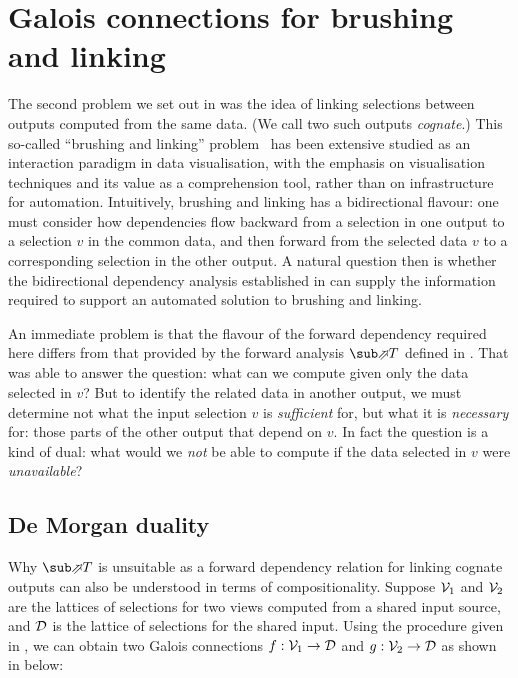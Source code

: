 \section{Galois connections for brushing and linking}
\label{sec:de-morgan}

The second problem we set out in  was the idea of linking selections between outputs computed from the same data. (We call two such outputs \emph{cognate}.) This so-called ``brushing and linking'' problem~\cite{becker87} has been extensive studied as an interaction paradigm in data visualisation, with the emphasis on visualisation techniques and its value as a comprehension tool, rather than on infrastructure for automation. Intuitively, brushing and linking has a bidirectional flavour: one must consider how dependencies flow backward from a selection in one output to a selection $v$ in the common data, and then forward from the selected data $v$ to a corresponding selection in the other output. A natural question then is whether the bidirectional dependency analysis established in  can supply the information required to support an automated solution to brushing and linking.

An immediate problem is that the flavour of the forward dependency required here differs from that provided by the forward analysis $\evalFwdF{T}$ defined in . That was able to answer the question: what can we compute given only the data selected in $v$? But to identify the related data in another output, we must determine not what the input selection $v$ is \emph{sufficient} for, but what it is \emph{necessary} for: those parts of the other output that depend on $v$. In fact the question is a kind of dual: what would we \emph{not} be able to compute if the data selected in $v$ were \emph{unavailable}?

\subsection{De Morgan duality}
\label{sec:de-morgan:de-morgan-duality}

Why $\evalFwdF{T}$ is unsuitable as a forward dependency relation for linking cognate outputs can also be understood in terms of compositionality. Suppose $\mathcal{V}_1$ and $\mathcal{V}_2$ are the lattices of selections for two views computed from a shared input source, and $\mathcal{D}$ is the lattice of selections for the shared input. Using the procedure given in , we can obtain two Galois connections $f: \mathcal{V}_1 \to \mathcal{D}$ and $g: \mathcal{V}_2 \to \mathcal{D}$ as shown in  below:

